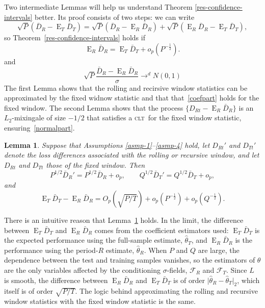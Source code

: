 \documentclass[11pt]{article}
\newtheorem{lem}[thm]{Lemma}
\DeclareMathOperator{\E}{E}
\newcommand{\oosA}{\bar{D}_{R}}
\newcommand{\oosB}{\bar{D}_{T}}
\newcommand{\clt}{\textsc{clt}}
\begin{document}
Two intermediate Lemmas will help us understand Theorem
\ref{res-confidence-intervals} better.  Its proof consists of two
steps: we can write
\begin{equation}
  \sqrt{P} (\oosA - \E_T \oosB) = \sqrt{P} (\oosA - \E_R
  \oosA) + \sqrt{P} (\E_R \oosA - \E_T \oosB),
\end{equation}
so Theorem~\ref{res-confidence-intervals} holds if
\begin{equation}\label{coefpart}
  \E_R \oosA = \E_T \oosB + o_p(P^{-\frac12}).
\end{equation}
and
\begin{equation}\label{normalpart}
  \sqrt{P}\frac{\oosA - \E_R \oosA}{\sigma} \to^d N(0,1)
\end{equation}
The first Lemma shows that the rolling and recirsive window statistics
can be approximated by the fixed widnow statistic and that
that~\eqref{coefpart} holds for the fixed window.  The second Lemma
shows that the process $\{D_{Rt} - \E_R \oosA\}$ is an $L_2$-mixingale
of size $-1/2$ that satisfies a \clt\ for the fixed window statistic,
ensuring~\eqref{normalpart}.

\begin{lem} \label{res-convergence} Suppose that Assumptions
  \ref{asmp-1}--\ref{asmp-4} hold, let $D_{Rt}'$ and $D_{Tt}'$ denote
  the loss differences associated with the rolling or recursive
  window, and let $D_{Rt}$ and $D_{Tt}$ those of the fixed window.  Then
  \begin{equation}
    \label{eq:8}
    P^{1/2} \oosA' = P^{1/2} \oosA + o_p, \qquad Q^{1/2} \oosB' =
    Q^{1/2} \oosB + o_p,
  \end{equation}
  and
  \begin{equation}\label{eq:7}
    \E_T \oosB - \E_R \oosA =  O_p(\sqrt{P/T}) +
    o_p(P^{-\frac12}) + o_p(Q^{-\frac12}).
  \end{equation}
\end{lem}

There is an intuitive reason that Lemma~\ref{res-convergence} holds.
In the limit, the difference between $\E_T \oosB$ and $\E_R \oosA$
comes from the coefficient estimators used: $\E_T\oosB$ is the
expected performance using the full-sample estimate, $\hat{\theta}_T$,
and $\E_R \oosA$ is the performance using the period-$R$ estimate,
$\hat{\theta}_R$.  When $P$ and $Q$ are large, the dependence between
the test and training samples vanishes, so the estimators of $\theta$
are the only variables affected by the conditioning $\sigma$-fields,
$\mathcal{F}_R$ and $\mathcal{F}_T$.  Since $L$ is smooth, the
difference between $\E_R \oosA$ and $\E_T \oosB$ is of order $\lvert
\hat\theta_R - \hat\theta_T \rvert_2$, which itself is of order
$\sqrt{P/T}$.  The logic behind approximating the rolling and
recursive window statistics with the fixed window statistic is the
same.
\end{document}
